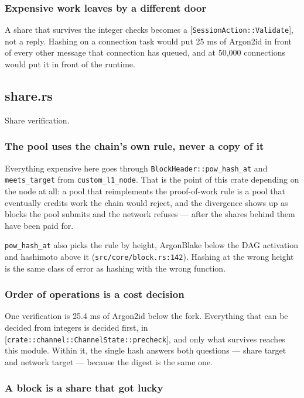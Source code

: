 \documentclass[11pt,a4paper]{article}
\begin{document}
\subsubsection{Expensive work leaves by a different door}

A share that survives the integer checks becomes a
[\texttt{SessionAction::Validate}], not a reply. Hashing on a connection task would
put 25 ms of Argon2id in front of every other message that connection has
queued, and at 50,000 connections would put it in front of the runtime.

\subsection{share.rs}
Share verification.

\subsubsection{The pool uses the chain's own rule, never a copy of it}

Everything expensive here goes through \texttt{BlockHeader::pow\_hash\_at} and
\texttt{meets\_target} from \texttt{custom\_l1\_node}. That is the point of this crate
depending on the node at all: a pool that reimplements the proof-of-work
rule is a pool that eventually credits work the chain would reject, and the
divergence shows up as blocks the pool submits and the network refuses —
after the shares behind them have been paid for.

\texttt{pow\_hash\_at} also picks the rule by height, ArgonBlake below the DAG
activation and hashimoto above it (\texttt{src/core/block.rs:142}). Hashing at the
wrong height is the same class of error as hashing with the wrong function.

\subsubsection{Order of operations is a cost decision}

One verification is 25.4 ms of Argon2id below the fork. Everything that can
be decided from integers is decided first, in
[\texttt{crate::channel::ChannelState::precheck}], and only what survives reaches
this module. Within it, the single hash answers both questions — share
target and network target — because the digest is the same one.

\subsubsection{A block is a share that got lucky}
\end{document}

